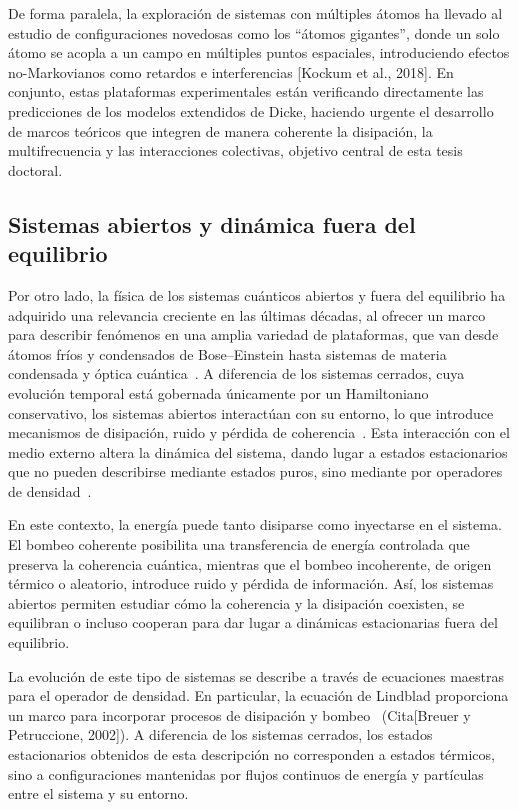 \documentclass[onecolumn,notitlepage,letterpaper,aps,pra,12pt]{article}
\numberwithin{equation}{section}
\begin{document}
De forma paralela, la exploración de sistemas con múltiples átomos ha llevado al estudio de configuraciones novedosas como los ``átomos gigantes'', donde un solo átomo se acopla a un campo en múltiples puntos espaciales, introduciendo efectos no-Markovianos como retardos e interferencias [Kockum et al., 2018]. En conjunto, estas plataformas experimentales están verificando directamente las predicciones de los modelos extendidos de Dicke, haciendo urgente el desarrollo de marcos teóricos que integren de manera coherente la disipación, la multifrecuencia y las interacciones colectivas, objetivo central de esta tesis doctoral.


\subsection{Sistemas abiertos y dinámica fuera del equilibrio}

Por otro lado, la física de los sistemas cuánticos abiertos y fuera del equilibrio ha adquirido una relevancia creciente en las últimas décadas, al ofrecer un marco para describir fenómenos en una amplia variedad de plataformas, que van desde átomos fríos y condensados de Bose–Einstein hasta sistemas de materia condensada y óptica cuántica~\cite{rotter2015}.
A diferencia de los sistemas cerrados, cuya evolución temporal está gobernada únicamente por un Hamiltoniano conservativo, los sistemas abiertos interactúan  con su entorno, lo que introduce mecanismos de disipación, ruido y pérdida de coherencia~\cite{Sieberer2016}. Esta interacción con el medio externo altera la dinámica del sistema, dando lugar a estados estacionarios que no pueden describirse mediante estados puros, sino mediante por operadores de densidad~\cite{breuer2003}.

En este contexto, la energía puede tanto disiparse como inyectarse en el sistema. El bombeo coherente posibilita una transferencia de energía controlada que preserva la coherencia cuántica, mientras que el bombeo incoherente, de origen térmico o aleatorio, introduce ruido y pérdida de información. Así, los sistemas abiertos permiten estudiar cómo la coherencia y la disipación coexisten, se equilibran o incluso cooperan para dar lugar a dinámicas estacionarias fuera del equilibrio.

La evolución de este tipo de sistemas se describe a través de ecuaciones maestras para el operador de densidad. En particular, la ecuación de Lindblad proporciona un marco  para incorporar procesos de disipación y bombeo~\cite{Fazio2025} (Cita[Breuer y Petruccione, 2002]). A diferencia de los sistemas cerrados, los estados estacionarios obtenidos de esta descripción no corresponden a estados térmicos, sino a configuraciones mantenidas por flujos continuos de energía y partículas entre el sistema y su entorno.
\end{document}
